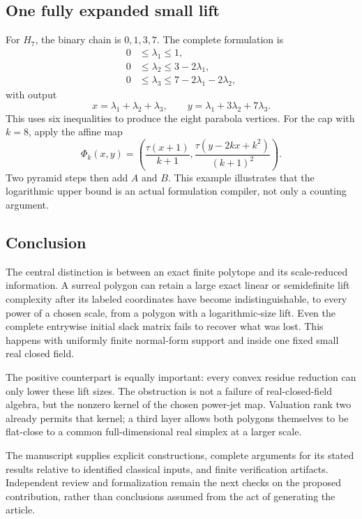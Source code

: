 \documentclass[11pt,a4paper]{article}
\numberwithin{equation}{section}
\theoremstyle{plain}
\begin{document}
\subsection{One fully expanded small lift}
For $H_7$, the binary chain is $0,1,3,7$. The complete formulation is
\begin{align*}
 0&\leq\lambda_1\leq1,\\
 0&\leq\lambda_2\leq3-2\lambda_1,\\
 0&\leq\lambda_3\leq7-2\lambda_1-2\lambda_2,
\end{align*}
with output
\[
 x=\lambda_1+\lambda_2+\lambda_3,\qquad
 y=\lambda_1+3\lambda_2+7\lambda_3.
\]
This uses six inequalities to produce the eight parabola vertices.
For the cap with $k=8$, apply the affine map
\[
 \Phi_k(x,y)=
 \left(\frac{\tau(x+1)}{k+1},
       \frac{\tau(y-2kx+k^2)}{(k+1)^2}\right).
\]
Two pyramid steps then add $A$ and $B$. This example illustrates that the
logarithmic upper bound is an actual formulation compiler, not only a
counting argument.

\subsection{Conclusion}
The central distinction is between an exact finite polytope and its
scale-reduced information. A surreal polygon can retain a large exact
linear or semidefinite lift complexity after its labeled coordinates
have become indistinguishable, to every power of a chosen scale, from a
polygon with a logarithmic-size lift. Even the complete entrywise initial
slack matrix fails to recover what was lost. This happens with uniformly
finite normal-form support and inside one fixed small real closed field.

The positive counterpart is equally important: every convex residue
reduction can only lower these lift sizes. The obstruction is not a
failure of real-closed-field algebra, but the nonzero kernel of the chosen
power-jet map. Valuation rank two already permits that kernel; a third
layer allows both polygons themselves to be flat-close to a common
full-dimensional real simplex at a larger scale.

The manuscript supplies explicit constructions, complete arguments for
its stated results relative to identified classical inputs, and finite
verification artifacts. Independent review and formalization remain the
next checks on the proposed contribution, rather than conclusions
assumed from the act of generating the article.
\end{document}
